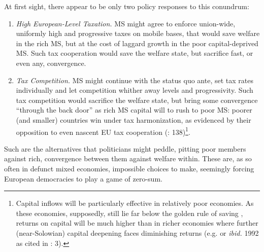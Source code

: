 \documentclass[11pt,a4paper,oneside,openright]{article}
\begin{document}
At first sight, there appear to be only two policy responses to this conundrum:
\begin{enumerate}
	\item \emph{High European-Level Taxation.} \gls{MS} might agree to enforce union-wide, uniformly high and progressive taxes on mobile bases, that would save welfare in the rich \gls{MS}, but at the cost of laggard growth in the poor capital-deprived \gls{MS}. 
	Such tax cooperation would save the welfare state, but sacrifice fast, or even any, convergence.
	\item \emph{Tax Competition.} \gls{MS} might continue with the status quo ante, set tax rates individually and let competition whither away levels and progressivity. 
	Such tax competition would sacrifice the welfare state, but bring some convergence ``through the back door'' as rich \gls{MS} capital will to rush to poor \gls{MS}: 
	poorer (and smaller) countries win under tax harmonization, as evidenced by their opposition to even nascent \gls{EU} tax cooperation (\citealt{Kellermann2009}: 138)\footnote{
		Capital inflows will be particularly effective in relatively poor economies. 
		As these economies, supposedly, still lie far below the golden rule of saving \citep{Solow1956}, returns on capital will be much higher than in richer economies where further (near-Solowian) capital deepening faces diminishing returns (e.g. \citealt{Barro1995} or \emph{ibid.} 1992 as cited in \citealt{Beckfield2009}: 3).}.
\end{enumerate}

Such are the alternatives that politicians might peddle, pitting poor members against rich, convergence between them against welfare within. 
These are, as so often in defunct mixed economies, impossible choices to make, seemingly forcing European democracies to play a game of zero-sum.
\end{document}
